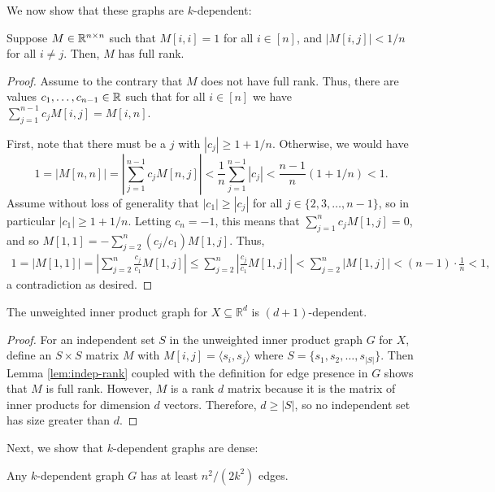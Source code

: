 We now show that these graphs are $k$-dependent:

\begin{lemma}\label{lem:indep-rank}
Suppose $M \in {\mathbb R}^{n \times n}$ such that $M[i,i] = 1$ for all $i \in [n]$, and $|M[i,j]| < 1/n$ for all $i \neq j$. Then, $M$ has full rank.
\end{lemma}

\begin{proof}
Assume to the contrary that $M$ does not have full rank. Thus, there are values $c_1, \ldots, c_{n-1} \in {\mathbb R}$ such that for all $i \in [n]$ we have $\sum_{j=1}^{n-1} c_j M[i,j] = M[i,n]$.

First, note that there must be a $j$ with $|c_j| \geq 1 + 1/n$. Otherwise, we would have
$$1 = |M[n,n]| = \left| \sum_{j=1}^{n-1} c_j M[n,j] \right| < \frac{1}{n}  \sum_{j=1}^{n-1} \left| c_j \right|  < \frac{n-1}{n} (1 + 1/n) < 1.$$
Assume without loss of generality that $|c_1| \geq |c_j|$ for all $j \in \{2,3,\ldots,n-1\}$, so in particular $|c_1| \geq 1 + 1/n$. Letting $c_n = -1$, this means that $\sum_{j=1}^n c_j M[1,j] = 0$, and so $M[1,1] = -\sum_{j=2}^n (c_j / c_1) M[1,j]$. Thus,
\begin{align*}
 1 = |M[1,1]| = \left| \sum_{j=2}^n \frac{c_j }{ c_1} M[1,j] \right| \leq  \sum_{j=2}^n \left|\frac{c_j }{ c_1} M[1,j] \right| <  \sum_{j=2}^n \left| M[1,j] \right| < (n-1)\cdot \frac{1}{n} < 1,
\end{align*}
a contradiction as desired.
\end{proof}

\begin{proposition}\label{prop:inner-product-dep}
The unweighted inner product graph for $X\subseteq \mathbb{R}^d$ is $(d+1)$-dependent.
\end{proposition}

\begin{proof}
For an independent set $S$ in the unweighted inner product graph $G$ for $X$, define an $S\times S$ matrix $M$ with $M[i,j] = \langle s_i,s_j\rangle$ where $S = \{s_1,s_2,\hdots,s_{|S|}\}$. Then Lemma \ref{lem:indep-rank} coupled with the definition for edge presence in $G$ shows that $M$ is full rank. However, $M$ is a rank $d$ matrix because it is the matrix of inner products for dimension $d$ vectors. Therefore, $d\ge |S|$, so no independent set has size greater than $d$.
\end{proof}

Next, we show that $k$-dependent graphs are dense:

\begin{proposition}\label{prop:k-dep-dense}
Any $k$-dependent graph $G$ has at least $n^2/(2k^2)$ edges.
\end{proposition}


